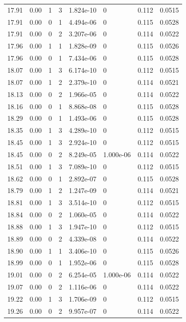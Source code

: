 \documentclass[preview]{standalone}
\begin{document}
{{{{{{{\begin{tabular}{L{1.2cm}C{1.2cm} C{0.3cm}C{0.5cm} C{1.4cm}C{1.4cm} C{1.4cm}C{1.4cm}}
  17.91  &  0.00  & 1     &  3 &  1.824e-10  & 0  & 0.112 &  0.0515   \\ 
  17.91  &  0.00  & 0     &  1 &  4.494e-06  & 0  & 0.115 &  0.0528   \\ 
  17.91  &  0.00  & 0     &  2 &  3.207e-06  & 0  & 0.114 &  0.0522   \\ 
  17.96  &  0.00  & 1     &  1 &  1.828e-09  & 0  & 0.115 &  0.0526   \\ 
  17.96  &  0.00  & 0     &  1 &  7.434e-06  & 0  & 0.115 &  0.0528   \\ 
  18.07  &  0.00  & 1     &  3 &  6.174e-10  & 0  & 0.112 &  0.0515   \\ 
  18.07  &  0.00  & 1     &  2 &  2.379e-10  & 0  & 0.114 &  0.0521   \\ 
  18.13  &  0.00  & 0     &  2 &  1.966e-05  & 0  & 0.114 &  0.0522   \\ 
  18.16  &  0.00  & 0     &  1 &  8.868e-08  & 0  & 0.115 &  0.0528   \\ 
  18.29  &  0.00  & 0     &  1 &  1.493e-06  & 0  & 0.115 &  0.0528   \\ 
  18.35  &  0.00  & 1     &  3 &  4.289e-10  & 0  & 0.112 &  0.0515   \\ 
  18.45  &  0.00  & 1     &  3 &  2.924e-10  & 0  & 0.112 &  0.0515   \\ 
  18.45  &  0.00  & 0     &  2 &  8.249e-05  & 1.000e-06  & 0.114 &  0.0522   \\ 
  18.51  &  0.00  & 1     &  3 &  7.089e-10  & 0  & 0.112 &  0.0515   \\ 
  18.62  &  0.00  & 0     &  1 &  2.892e-07  & 0  & 0.115 &  0.0528   \\ 
  18.79  &  0.00  & 1     &  2 &  1.247e-09  & 0  & 0.114 &  0.0521   \\ 
  18.81  &  0.00  & 1     &  3 &  3.514e-10  & 0  & 0.112 &  0.0515   \\ 
  18.84  &  0.00  & 0     &  2 &  1.060e-05  & 0  & 0.114 &  0.0522   \\ 
  18.88  &  0.00  & 1     &  3 &  1.947e-10  & 0  & 0.112 &  0.0515   \\ 
  18.89  &  0.00  & 0     &  2 &  4.339e-08  & 0  & 0.114 &  0.0522   \\ 
  18.90  &  0.00  & 1     &  1 &  3.406e-10  & 0  & 0.115 &  0.0526   \\ 
  18.99  &  0.00  & 0     &  1 &  1.952e-06  & 0  & 0.115 &  0.0528   \\ 
  19.01  &  0.00  & 0     &  2 &  6.254e-05  & 1.000e-06  & 0.114 &  0.0522   \\ 
  19.07  &  0.00  & 0     &  2 &  1.116e-06  & 0  & 0.114 &  0.0522   \\ 
  19.22  &  0.00  & 1     &  3 &  1.706e-09  & 0  & 0.112 &  0.0515   \\ 
  19.26  &  0.00  & 0     &  2 &  9.957e-07  & 0  & 0.114 &  0.0522   \\ 
\hline 
\end{tabular} 

}}}}}}}
\end{document}
